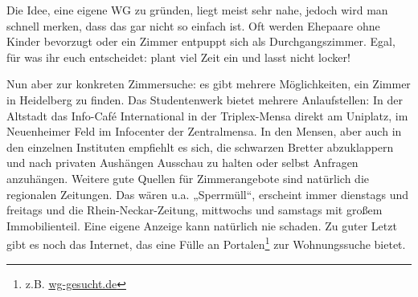Die Idee, eine eigene WG zu gründen, liegt meist sehr nahe, jedoch wird man schnell
merken, dass das gar nicht so einfach ist. Oft werden Ehepaare ohne Kinder bevorzugt
oder ein Zimmer entpuppt sich als Durchgangszimmer. Egal, für was ihr euch
entscheidet: plant viel Zeit ein und lasst nicht locker!

Nun aber zur konkreten Zimmersuche: es gibt mehrere Möglichkeiten, ein Zimmer in
Heidelberg zu finden. Das Studentenwerk bietet mehrere Anlaufstellen: In der
Altstadt das Info-Café International in der Triplex-Mensa direkt am Uniplatz, im
Neuenheimer Feld im Infocenter der Zentralmensa. In den Mensen, aber auch in den
einzelnen Instituten empfiehlt es sich, die schwarzen Bretter abzuklappern und nach
privaten Aushängen Ausschau zu halten oder selbst Anfragen anzuhängen. Weitere gute
Quellen für Zimmerangebote sind natürlich die regionalen Zeitungen. Das wären u.a.
„Sperrmüll“, erscheint immer dienstags und freitags und die Rhein-Neckar-Zeitung,
mittwochs und samstags mit großem Immobilienteil.
Eine eigene Anzeige kann natürlich nie schaden. Zu guter Letzt gibt es noch das
Internet, das eine Fülle an Portalen\footnote{z.B. \url{wg-gesucht.de}} zur
Wohnungssuche bietet.

\clearpage

